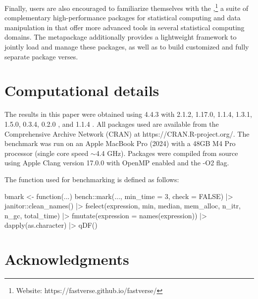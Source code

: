 \documentclass[article]{jss} %
\newcommand{\fct}[1]{\code{#1()}}
\begin{document}
Finally,  users are also encouraged to familiarize themselves with the \href{https://fastverse.github.io/fastverse/}{},\footnote{Website: https://fastverse.github.io/fastverse/} a suite of complementary high-performance packages for statistical computing and data manipulation in  that offer more advanced tools in several statistical computing domains. The  metapackage additionally provides a lightweight framework to jointly load and manage these packages, as well as to build customized and fully separate package verses.

\newpage

\section*{Computational details}
The results in this paper were obtained using  \citep{R} 4.4.3 with  2.1.2,  1.17.0,  1.1.4,  1.3.1,  1.5.0,  0.3.4,  0.2.0 \citep{rnycflights23}, and  1.1.4 \citep{rbench}. All packages used are available from the Comprehensive  Archive Network (CRAN) at https://CRAN.R-project.org/. The benchmark was run on an Apple MacBook Pro (2024) with a 48GB M4 Pro processor (single core speed $\sim$4.4 GHz). Packages were compiled from source using Apple Clang version 17.0.0 with OpenMP enabled and the -O2 flag. \newline

The \fct{bmark} function used for benchmarking is defined as follows:
\begin{Code}
bmark <- function(...) {
  bench::mark(..., min_time = 3, check = FALSE) |>
    janitor::clean_names() |>
    fselect(expression, min, median, mem_alloc, n_itr, n_gc, total_time) |>
    fmutate(expression = names(expression)) |>
    dapply(as.character) |> qDF()
}
\end{Code}



\section*{Acknowledgments}
\end{document}
